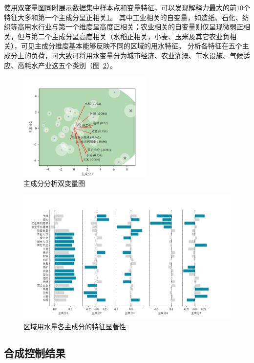 使用双变量图同时展示数据集中样本点和变量特征，可以发现解释力最大的前$10$个特征大多和第一个主成分呈正相关\ref{ch5:fig:biplot}。
其中工业相关的自变量，如造纸、石化、纺织等高用水行业与第一个维度呈高度正相关；农业相关的自变量则仅呈现微弱正相关，但与第二个主成分呈高度相关（水稻正相关，小麦、玉米及其它农业负相关），可见主成分维度基本能够反映不同的区域的用水特征。
分析各特征在五个主成分上的负荷，可大致可将用水变量分为城市经济、农业灌溉、节水设施、气候适应、高耗水产业这五个类别（图~\ref{ch5:fig:variables}）。


\begin{figure}[htb]
    \centering
    \includegraphics[width=0.6\textwidth]{img/ch5/ch5_biplot.png}
    \caption{主成分分析双变量图}\label{ch5:fig:biplot}
\end{figure}


\begin{figure}[htb]
    \centering
    \includegraphics[width=\textwidth]{img/ch5/ch5_variables.png}
    \caption{区域用水量各主成分的特征显著性}\label{ch5:fig:variables}
\end{figure}

\subsection{合成控制结果}\label{result-2}

